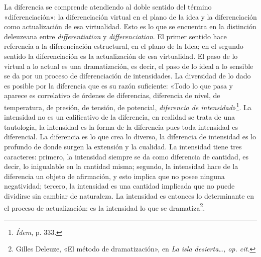 La diferencia se comprende atendiendo al doble sentido del término «diferenciación»: la diferenciación virtual en el plano de la idea y la diferenciación como actualización de esa virtualidad. Esto es lo que se encuentra en la distinción deleuzeana entre \emph{differentiation} y \emph{differenciation}. El primer sentido hace referencia a la diferenciación estructural, en el plano de la Idea; en el segundo sentido la diferenciación es la actualización de esa virtualidad. El paso de lo virtual a lo actual es una dramatización, es decir, el paso de lo ideal a lo sensible se da por un proceso de diferenciación de intensidades. La diversidad de lo dado es posible por la diferencia que es su razón suficiente: «Todo lo que pasa y aparece es correlativo de órdenes de diferencias, diferencia de nivel, de temperatura, de presión, de tensión, de potencial, \emph{diferencia de intensidad}»\footnote{\emph{Ídem}, p. 333.}. La intensidad no es un calificativo de la diferencia, en realidad se trata de una tautología, la intensidad es la forma de la diferencia pues toda intensidad es diferencial. La diferencia es lo que crea lo diverso, la diferencia de intensidad es lo profundo de donde surgen la extensión y la cualidad. La intensidad tiene tres caracteres: primero, la intensidad siempre se da como diferencia de cantidad, es decir, lo inigualable en la cantidad misma; segundo, la intensidad hace de la diferencia un objeto de afirmación, y esto implica que no posee ninguna negatividad; tercero, la intensidad es una cantidad implicada que no puede dividirse sin cambiar de naturaleza. La intensidad es entonces lo determinante en el proceso de actualización: es la intensidad lo que se dramatiza\footnote{Gilles Deleuze, «El método de dramatización», en \emph{La isla desierta\ldots, op. cit.}}.

